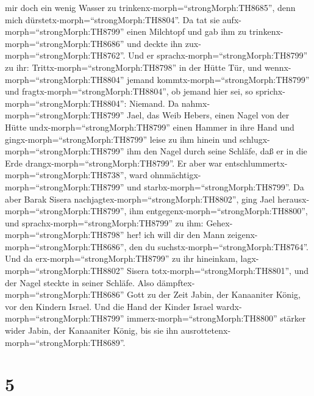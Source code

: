mir doch ein wenig Wasser zu trinkenx-morph=``strongMorph:TH8685'', denn
mich dürstetx-morph=``strongMorph:TH8804''. Da tat sie
aufx-morph=``strongMorph:TH8799'' einen Milchtopf und gab ihm zu
trinkenx-morph=``strongMorph:TH8686'' und deckte ihn
zux-morph=``strongMorph:TH8762''.  Und er
sprachx-morph=``strongMorph:TH8799'' zu ihr:
Trittx-morph=``strongMorph:TH8798'' in der Hütte Tür, und
wennx-morph=``strongMorph:TH8804'' jemand
kommtx-morph=``strongMorph:TH8799'' und
fragtx-morph=``strongMorph:TH8804'', ob jemand hier sei, so
sprichx-morph=``strongMorph:TH8804'': Niemand.  Da
nahmx-morph=``strongMorph:TH8799'' Jael, das Weib Hebers, einen Nagel
von der Hütte undx-morph=``strongMorph:TH8799'' einen Hammer in ihre
Hand und gingx-morph=``strongMorph:TH8799'' leise zu ihm hinein und
schlugx-morph=``strongMorph:TH8799'' ihm den Nagel durch seine Schläfe,
daß er in die Erde drangx-morph=``strongMorph:TH8799''. Er aber war
entschlummertx-morph=``strongMorph:TH8738'', ward
ohnmächtigx-morph=``strongMorph:TH8799'' und
starbx-morph=``strongMorph:TH8799''.  Da aber Barak Sisera
nachjagtex-morph=``strongMorph:TH8802'', ging Jael
herausx-morph=``strongMorph:TH8799'', ihm
entgegenx-morph=``strongMorph:TH8800'', und
sprachx-morph=``strongMorph:TH8799'' zu ihm:
Gehex-morph=``strongMorph:TH8798'' her! ich will dir den Mann
zeigenx-morph=``strongMorph:TH8686'', den du
suchstx-morph=``strongMorph:TH8764''. Und da
erx-morph=``strongMorph:TH8799'' zu ihr hineinkam,
lagx-morph=``strongMorph:TH8802'' Sisera
totx-morph=``strongMorph:TH8801'', und der Nagel steckte in seiner
Schläfe.  Also dämpftex-morph=``strongMorph:TH8686'' Gott
zu der Zeit Jabin, der Kanaaniter König, vor den Kindern Israel.
 Und die Hand der Kinder Israel
wardx-morph=``strongMorph:TH8799'' immerx-morph=``strongMorph:TH8800''
stärker wider Jabin, der Kanaaniter König, bis sie ihn
ausrottetenx-morph=``strongMorph:TH8689''.

\hypertarget{section-4}{%
\section{5}\label{section-4}}

